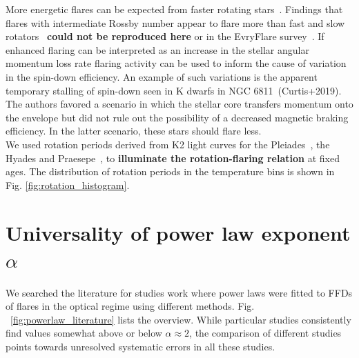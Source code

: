 \documentclass{aa}
\begin{document}
\begin{appendix}
\begin{figure}
   \end{figure}
More energetic flares can be expected from faster rotating stars~\citep{candelaresi_superflare_2014, doorsselaere_stellar_2017, yang_flaring_2017}. Findings that flares with intermediate Rossby number appear to flare more than fast and slow rotators~\citep{mondrik_flarerotation_2019} \textbf{could not be reproduced here} or in the EvryFlare survey~\citep{howard_evryflare2arxiv_2019}. If enhanced flaring can be interpreted as an increase in the stellar angular momentum loss rate flaring activity can be used to inform the cause of variation in the spin-down efficiency. An example of such variations is the apparent temporary stalling of spin-down seen in K dwarfs in NGC 6811~(Curtis+2019). The authors favored a scenario in which the stellar core transfers momentum onto the envelope but did not rule out the possibility of a decreased magnetic braking efficiency. In the latter scenario, these stars should flare less. %
\\
We used rotation periods derived from K2 light curves for the Pleiades~\citep{rebull_pleiadesrot_2016}, the Hyades and Praesepe~\citep{douglas2019}, to \textbf{illuminate the rotation-flaring relation} at fixed ages. The distribution of rotation periods in the temperature bins is shown in Fig. \ref{fig:rotation_histogram}.
\section{Universality of power law exponent $\alpha$}
\label{sec:app:universal_alpha}
We searched the literature for studies work where power laws were fitted to FFDs of flares in the optical regime using different methods. Fig. ~\ref{fig:powerlaw_literature} lists the overview. While particular studies consistently find values somewhat above or below $\alpha\approx2$, the comparison of different studies points towards unresolved systematic errors in all these studies.


\end{appendix}
\end{document}
